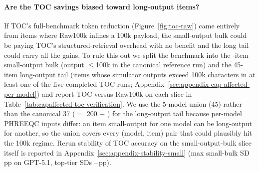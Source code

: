 \documentclass{article}
\begin{document}
\paragraph{Are the TOC savings biased toward long-output items?}
If TOC's full-benchmark token reduction (Figure~\ref{fig:toc-raw}) came entirely from items where Raw100k inlines a 100k payload, the small-output bulk could be paying TOC's structured-retrieval overhead with no benefit and the long tail could carry all the gains. To rule this out we split the benchmark into the \RawCapUnaffectedN{}-item small-output bulk (output $\le$100k in the canonical reference run) and the 45-item long-output tail (items whose simulator outputs exceed 100k characters in at least one of the five completed TOC runs; Appendix~\ref{sec:appendix-cap-affected-per-model}) and report TOC versus Raw100k on each slice in Table~\ref{tab:capaffected-toc-verification}. We use the 5-model union (45) rather than the canonical 37 ($=$ 200 $-$ \RawCapUnaffectedN{}) for the long-output tail because per-model PHREEQC inputs differ: an item small-output for one model can be long-output for another, so the union covers every (model, item) pair that could plausibly hit the 100k regime. Rerun stability of TOC accuracy on the small-output-bulk slice itself is reported in Appendix~\ref{sec:appendix-stability-small} (max small-bulk SD \GPTFiveOneTOCSmallRerunSD\,pp on GPT-5.1, top-tier SDs \SonnetTOCSmallRerunSD--\GPTFiveFourTOCSmallRerunSD\,pp).
\end{document}
